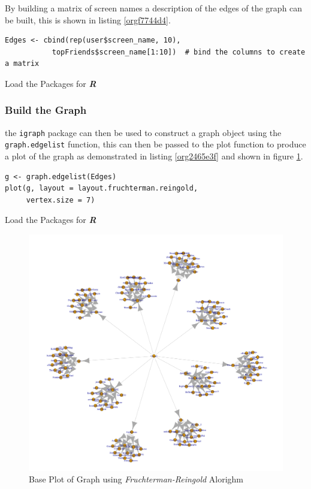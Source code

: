 \documentclass[11pt]{article}
\begin{document}
By building a matrix of screen names a description of the edges of the graph can be built, this is shown in listing \ref{orgf7744d4}.

\begin{listing}[htbp]
\begin{verbatim}
Edges <- cbind(rep(user$screen_name, 10),
           topFriends$screen_name[1:10])  # bind the columns to create a matrix

\end{verbatim}
\caption{\label{orgf7744d4}Load the Packages for \textbf{\textbf{\emph{R}}}}
\end{listing}

\subsubsection{Build the Graph}
\label{sec:orgd5e1792}
the \texttt{igraph} package can then be used to construct a graph object using the \texttt{graph.edgelist} function, this can then be passed to the plot function to produce a plot of the graph as demonstrated in listing \ref{org2465e3f} and shown in figure \ref{fig:org6bf3aae}.

\begin{listing}[htbp]
\begin{verbatim}
g <- graph.edgelist(Edges)
plot(g, layout = layout.fruchterman.reingold,
     vertex.size = 7)
\end{verbatim}
\caption{\label{org2465e3f}Load the Packages for \textbf{\textbf{\emph{R}}}}
\end{listing}


\begin{figure}[htbp]
\centering
\includegraphics[width=12cm]{./Figures/Graph_Base_1.png}
\caption{\label{fig:org6bf3aae}Base Plot of Graph using \emph{Fruchterman-Reingold} Alorighm}
\end{figure}
\end{document}
